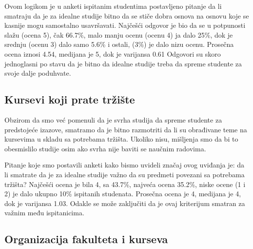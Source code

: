 \documentclass[a4paper]{article}
\begin{document}
Ovom logikom je u anketi ispitanim studentima postavljeno pitanje da li smatraju da je za idealne studije bitno da se stiče dobra osnova na osnovu koje se kasnije mogu samostalno usavršavati. Najčešći odgovor je bio da se u potpunosti slažu (ocena 5), čak 66.7\%, malo manju ocenu (ocenu 4) ja dalo 25\%, dok je srednju (ocenu 3) dalo samo 5.6\% i ostali, (3\%) je dalo nizu ocenu. Prosečna ocena iznosi 4.54, medijana je 5, dok je varijansa 0.61 Odgovori su skoro jednoglasni po stavu da je bitno da idealne studije treba da spreme studente za svoje dalje poduhvate. 

\subsection{Kursevi koji prate tržište}
\label{subsec:tržište}
Obzirom da smo već pomenuli da je svrha studija da spreme studente za predstojeće izazove, smatramo da je bitno razmotriti da li su obrađivane teme na kursevima u skladu sa potrebama tržišta. Ukoliko nisu, mišljenja smo da bi to obesmislilo studije osim ako svrha nije baviti se naučnim radovima.

Pitanje koje smo postavili anketi kako bismo uvideli značaj ovog uviđanja je: da li smatrate da je za idealne studije važno da su predmeti povezani sa potrebama tržišta? Najčešći ocena je bila 4, sa 43.7\%, najveća ocena 35.2\%, niske ocene (1 i 2) je dalo ukupno 10\% ispitanih studenata. Prosečna ocena je 4, medijana je 4, dok je varijansa 1.03. Odakle se može zaključiti da je ovaj kriterijum smatran za važnim među ispitanicima.


\subsection{Organizacija fakulteta i kurseva}
\label{subsec:podnaslov1}
\end{document}
